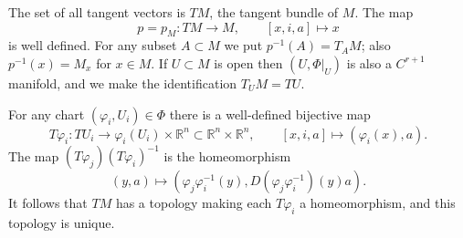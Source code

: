 The set of all tangent vectors is $TM$, the tangent bundle of $M$. The map
$$p = p_M: TM \to M, \qquad [x,i,a] \mapsto x$$
is well defined. For any subset $A \subset M$ we put $p^{-1}(A) = T_A M$; also $p^{-1}(x) = M_x$ for $x \in M$. If $U \subset M$ is open then $(U, \Phi|_U)$ is also a $C^{r+1}$ manifold, and we make the identification $T_U M = TU$.

For any chart $(\varphi_i, U_i) \in \Phi$ there is a well-defined bijective map
$$T\varphi_i: TU_i \to \varphi_i(U_i) \times \mathbb{R}^n \subset \mathbb{R}^n \times \mathbb{R}^n, \qquad [x,i,a] \mapsto (\varphi_i(x), a).$$
The map $(T\varphi_j)(T\varphi_i)^{-1}$ is the homeomorphism
$$(y,a) \mapsto (\varphi_j\varphi_i^{-1}(y), D(\varphi_j\varphi_i^{-1})(y)a).$$
It follows that $TM$ has a topology making each $T\varphi_i$ a homeomorphism, and this topology is unique.
